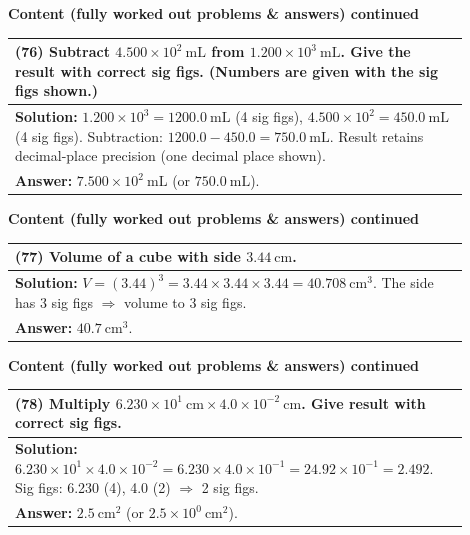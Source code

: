 \documentclass{article}
\begin{document}
\noindent
{\large \textbf{Content (fully worked out problems \& answers) continued}} \\[0.2em]
\begin{tabular}{|p{0.9\linewidth}|}
\hline
\vspace{0.2cm}

\textbf{(76)} Subtract $4.500\times 10^{2}~\text{mL}$ from $1.200\times 10^{3}~\text{mL}$. Give the result with correct sig figs. (Numbers are given with the sig figs shown.) \\
\hline
\vspace{0.2cm}
\textbf{Solution:} $1.200\times10^{3}=1200.0~\text{mL}$ (4 sig figs), $4.500\times10^{2}=450.0~\text{mL}$ (4 sig figs). Subtraction: $1200.0-450.0=750.0~\text{mL}$. Result retains decimal-place precision (one decimal place shown). \\
\textbf{Answer:} $7.500\times 10^{2}~\text{mL}$ (or $750.0~\text{mL}$). \\
\hline
\end{tabular}
\newpage

\noindent
{\large \textbf{Content (fully worked out problems \& answers) continued}} \\[0.2em]
\begin{tabular}{|p{0.9\linewidth}|}
\hline
\vspace{0.2cm}

\textbf{(77)} Volume of a cube with side $3.44~\text{cm}$. \\
\hline
\vspace{0.2cm}
\textbf{Solution:} $V=(3.44)^3=3.44\times3.44\times3.44=40.708~\text{cm}^3$. The side has 3 sig figs $\Rightarrow$ volume to 3 sig figs. \\
\textbf{Answer:} $40.7~\text{cm}^3$. \\
\hline
\end{tabular}
\newpage

\noindent
{\large \textbf{Content (fully worked out problems \& answers) continued}} \\[0.2em]
\begin{tabular}{|p{0.9\linewidth}|}
\hline
\vspace{0.2cm}

\textbf{(78)} Multiply $6.230\times 10^{1}~\text{cm}\times 4.0\times 10^{-2}~\text{cm}$. Give result with correct sig figs. \\
\hline
\vspace{0.2cm}
\textbf{Solution:} $6.230\times 10^{1}\times 4.0\times 10^{-2}=6.230\times4.0\times10^{-1}=24.92\times10^{-1}=2.492$. Sig figs: 6.230 (4), 4.0 (2) $\Rightarrow$ 2 sig figs. \\
\textbf{Answer:} $2.5~\text{cm}^2$ (or $2.5\times 10^{0}~\text{cm}^2$). \\
\hline
\end{tabular}
\newpage
\end{document}
